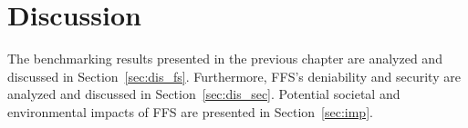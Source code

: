 
\chapter{Discussion}
\label{ch:discussion}
The benchmarking results presented in the previous chapter are analyzed and discussed in Section~\ref{sec:dis_fs}. Furthermore, \gls{FFS}'s deniability and security are analyzed and discussed in Section~\ref{sec:dis_sec}. Potential societal and environmental impacts of \gls{FFS} are presented in Section~\ref{sec:imp}.






